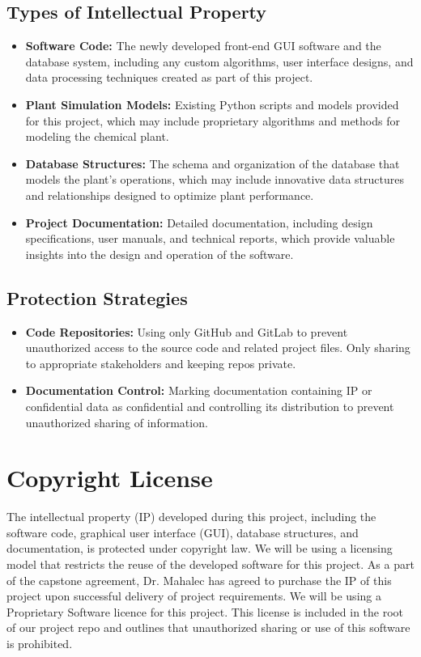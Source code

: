 \documentclass{article}
\begin{document}
\subsection*{Types of Intellectual Property}
\begin{itemize}
    \item \textbf{Software Code:} The newly developed front-end GUI software and the database system, including any custom algorithms, user interface designs, and data processing techniques created as part of this project.
    \item \textbf{Plant Simulation Models:} Existing Python scripts and models provided for this project, which may include proprietary algorithms and methods for modeling the chemical plant.
    \item \textbf{Database Structures:} The schema and organization of the database that models the plant's operations, which may include innovative data structures and relationships designed to optimize plant performance.
    \item \textbf{Project Documentation:} Detailed documentation, including design specifications, user manuals, and technical reports, which provide valuable insights into the design and operation of the software.
\end{itemize}

\subsection*{Protection Strategies}
\begin{itemize}

    \item \textbf{Code Repositories:} Using only GitHub and GitLab to prevent unauthorized access to the source code and related project files. Only sharing to appropriate stakeholders and keeping repos private.
    \item \textbf{Documentation Control:} Marking documentation containing IP or confidential data as confidential and controlling its distribution to prevent unauthorized sharing of information. 

\end{itemize}


\section{Copyright License}
The intellectual property (IP) developed during this project, including the software code, graphical user interface (GUI), database structures, and documentation, is protected under copyright law. 
We will be using a licensing model that restricts the reuse of the developed software for this project. As a part of the capstone agreement, Dr. Mahalec has agreed to purchase the IP of this project upon successful delivery of project requirements.
We will be using a Proprietary Software licence for this project. This license is included in the root of our project repo and outlines that unauthorized sharing or use of this software is prohibited. 
\end{document}
